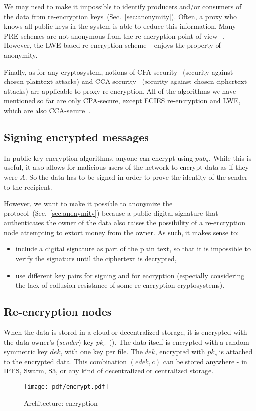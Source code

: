 \documentclass[longbibliography,nofootinbib]{revtex4-1}
\begin{document}
\begin{CJK*}{UTF8}{gbsn}
We may need to make it impossible to identify producers and/or consumers of the data from re-encryption keys~(Sec.~\ref{sec:anonymity}).
Often, a proxy who knows all public keys in the system is able to deduce this information. 
Many PRE schemes are not anonymous from the re-encryption point of view ~\cite{BBS98,AFGH}. However, the LWE-based re-encryption scheme ~\cite{lwe-reencryption} enjoys the property of anonymity.

Finally, as for any cryptosystem, notions of CPA-security~\cite{wiki:cpa} (security against chosen-plaintext attacks)
and CCA-security~\cite{wiki:cca} (security against chosen-ciphertext attacks) are applicable to proxy re-encryption.
All of the algorithms we have mentioned so far are only CPA-secure, except ECIES re-encryption and LWE, which are also CCA-secure~\cite{lwe-reencryption}.

\subsection{Signing encrypted messages}

In public-key encryption algorithms, anyone can encrypt using $pub_a$.
While this is useful, it also allows for malicious users of the network to encrypt data as if they were $A$.
So the data has to be signed in order to prove the identity of the sender to the recipient.

However, we want to make it possible to anonymize the protocol~(Sec.~\ref{sec:anonymity}) because
a public digital signature that authenticates the owner of the data also raises the possibility of a re-encryption node attempting to extort money from the owner.
As such, it makes sense to:
\begin{itemize}
    \item include a digital signature as part of the plain text, so that it is impossible to verify the signature until the ciphertext is decrypted,
    \item use different key pairs for signing and for encryption (especially considering the lack of collusion resistance of some re-encryption
        cryptosystems).
\end{itemize}

\subsection{Re-encryption nodes}

When the data is stored in a cloud or decentralized storage, it is encrypted with the data owner's (\emph{sender}) key $pk_s$~().
The data itself is encrypted with a random symmetric key $dek$, with one key per file.
The $dek$, encrypted with $pk_s$ is attached to the encrypted data.
This combination $(edek, c)$ can be stored anywhere - in IPFS, Swarm, S3, or any kind of decentralized or centralized storage.
\begin{figure}
\centering
    \texttt{[image: pdf/encrypt.pdf]}
    \caption{Architecture: encryption}
    \label{fig:arch-encrypt}
\end{figure}


\end{CJK*}
\end{document}
